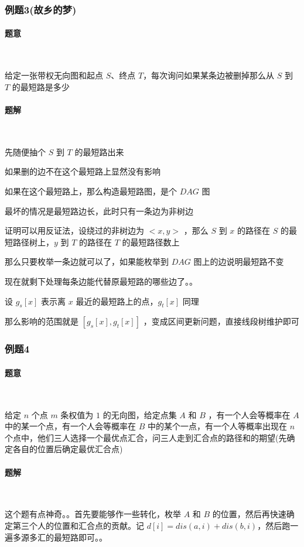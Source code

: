 	\subsubsection{例题3(故乡的梦)}
	\paragraph{题意}~
	
	给定一张带权无向图和起点 $S$、终点 $T$，每次询问如果某条边被删掉那么从 $S$ 到 $T$ 的最短路是多少
	\paragraph{题解}~
	
	先随便抽个 $S$ 到 $T$ 的最短路出来
	
	如果删的边不在这个最短路上显然没有影响
	
	如果在这个最短路上，那么构造最短路图，是个 $DAG$ 图
	
	最坏的情况是最短路边长，此时只有一条边为非树边
	
	证明可以用反证法，设绕过的非树边为 $<x,y>$ ，那么 $S$ 到 $x$ 的路径在 $S$ 的最短路径树上，$y$ 到 $T$ 的路径在 $T$ 的最短路径数上
	
	那么只要枚举一条边就可以了，如果能枚举到 $DAG$ 图上的边说明最短路不变
	
	现在就剩下处理每条边能代替原最短路的哪些边了。。
	
	设 $g_s[x]$ 表示离 $x$ 最近的最短路上的点，$g_t[x]$ 同理
	
	那么影响的范围就是 $[g_s[x],g_t[x]]$ ，变成区间更新问题，直接线段树维护即可\\
	\subsubsection{例题4}
	\paragraph{题意}~
	
	给定 $n$ 个点 $m$ 条权值为 $1$ 的无向图，给定点集 $A$ 和 $B$ ，有一个人会等概率在 $A$ 中的某一个点，有一个人会等概率在 $B$ 中的某个一点，有一个人等概率出现在 $n$ 个点中，他们三人选择一个最优点汇合，问三人走到汇合点的路径和的期望(先确定各自的位置后确定最优汇合点)
	\paragraph{题解}~
	
	这个题有点神奇。。首先要能够作一些转化，枚举 $A$ 和 $B$ 的位置，然后再快速确定第三个人的位置和汇合点的贡献。记 $d[i]=dis(a,i)+dis(b,i)$，然后跑一遍多源多汇的最短路即可。。
	
